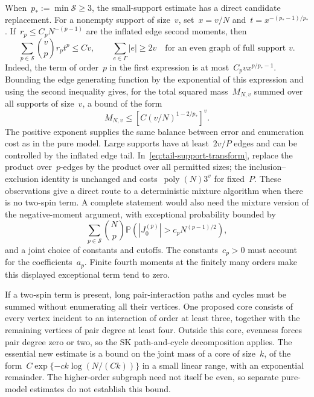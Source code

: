 \documentclass[10pt]{article}
\theoremstyle{plain}
\theoremstyle{definition}
\theoremstyle{remark}
\begin{document}
When~$p_*:=\min\mathcal S\ge3$, the small-support estimate has a direct candidate replacement. For a nonempty support of size~$v$, set~$x=v/N$ and~$t=x^{-(p_*-1)/p_*}$. If~$r_p\le C_pN^{-(p-1)}$ are the inflated edge second moments, then
\begin{equation}\label{eq:extension-incidence}
 \sum_{p\in\mathcal S}\binom vp r_pt^p\le Cv,
 \qquad \sum_{e\in\Gamma}|e|\ge2v
 \quad\text{for an even graph of full support }v.
\end{equation}
Indeed, the term of order~$p$ in the first expression is at most~$C_pv x^{p/p_*-1}$. Bounding the edge generating function by the exponential of this expression and using the second inequality gives, for the total squared mass~$M_{N,v}$ summed over all supports of size~$v$, a bound of the form
\begin{equation}\label{eq:extension-support}
 M_{N,v}\le\left[C(v/N)^{1-2/p_*}\right]^v.
\end{equation}
The positive exponent supplies the same balance between error and enumeration cost as in the pure model. Large supports have at least~$2v/P$ edges and can be controlled by the inflated edge tail. In~\eqref{eq:tail-support-transform}, replace the product over~$p$-edges by the product over all permitted sizes; the inclusion--exclusion identity is unchanged and costs~$\operatorname{poly}(N)3^v$ for fixed~$P$. These observations give a direct route to a deterministic mixture algorithm when there is no two-spin term. A complete statement would also need the mixture version of the negative-moment argument, with exceptional probability bounded by
\begin{equation*}
 \sum_{p\in\mathcal S}\binom Np
 \mathbb P\!\left(|J_0^{(p)}|>c_pN^{(p-1)/2}\right),
\end{equation*}
and a joint choice of constants and cutoffs. The constants~$c_p>0$ must account for the coefficients~$a_p$. Finite fourth moments at the finitely many orders make this displayed exceptional term tend to zero.

If a two-spin term is present, long pair-interaction paths and cycles must be summed without enumerating all their vertices. One proposed core consists of every vertex incident to an interaction of order at least three, together with the remaining vertices of pair degree at least four. Outside this core, evenness forces pair degree zero or two, so the SK path-and-cycle decomposition applies. The essential new estimate is a bound on the joint mass of a core of size~$k$, of the form~$C\exp\{-c k\log(N/(Ck))\}$ in a small linear range, with an exponential remainder. The higher-order subgraph need not itself be even, so separate pure-model estimates do not establish this bound.
\end{document}
